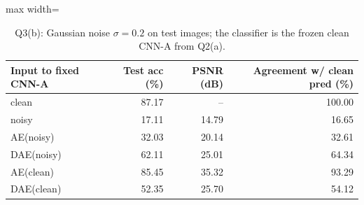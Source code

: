 \begin{table}[!tbp]\centering\footnotesize\setlength{\tabcolsep}{3pt}
\begin{adjustbox}{max width=\columnwidth}
\begin{tabular}{lrrr}\toprule
Input to fixed CNN-A & Test acc (\%) & PSNR (dB) & Agreement w/ clean pred (\%) \\\midrule
clean & 87.17 & -- & 100.00 \\
noisy & 17.11 & 14.79 & 16.65 \\
AE(noisy) & 32.03 & 20.14 & 32.61 \\
DAE(noisy) & 62.11 & 25.01 & 64.34 \\
AE(clean) & 85.45 & 35.32 & 93.29 \\
DAE(clean) & 52.35 & 25.70 & 54.12 \\
\bottomrule\end{tabular}
\end{adjustbox}
\caption{Q3(b): Gaussian noise $\sigma=0.2$ on test images; the classifier is the frozen clean CNN-A from Q2(a).}\label{tab:q3b}\end{table}
